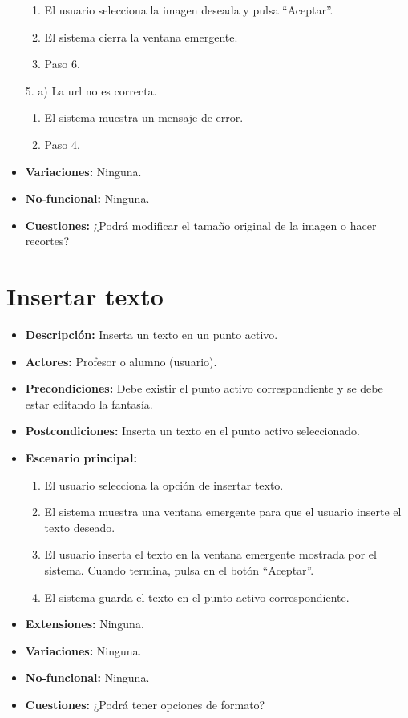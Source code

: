 \documentclass[12pt,letterpaper]{article}
\begin{document}
\begin{itemize}
\begin{enumerate}
		\item El usuario selecciona la imagen deseada y pulsa ``Aceptar''.
		\item El sistema cierra la ventana emergente.
		\item Paso 6.
	\end{enumerate}
	5. a) La url no es correcta.
	\begin{enumerate}
		\item El sistema muestra un mensaje de error.
		\item Paso 4.
	\end{enumerate}
	\item \textbf{Variaciones:} Ninguna.
	\item \textbf{No-funcional:} Ninguna.
	\item \textbf{Cuestiones:} ¿Podrá modificar el tamaño original de la imagen o hacer recortes?
\end{itemize}

\section{Insertar texto} %
\begin{itemize}
	\item \textbf{Descripción:} Inserta un texto en un punto activo.
	\item \textbf{Actores:} Profesor o alumno (usuario).
	\item \textbf{Precondiciones:} Debe existir el punto activo correspondiente y se debe estar editando la fantasía.
	\item \textbf{Postcondiciones:} Inserta un texto en el punto activo seleccionado.
	\item \textbf{Escenario principal:}
	\begin{enumerate}
		\item El usuario selecciona la opción de insertar texto.
		\item El sistema muestra una ventana emergente para que el usuario inserte el texto deseado.
		\item El usuario inserta el texto en la ventana emergente mostrada por el sistema. Cuando termina, pulsa en el botón ``Aceptar''.
		\item El sistema guarda el texto en el punto activo correspondiente.
	\end{enumerate}
	\item \textbf{Extensiones:} Ninguna.
	\item \textbf{Variaciones:} Ninguna.
	\item \textbf{No-funcional:} Ninguna.
	\item \textbf{Cuestiones:} ¿Podrá tener opciones de formato?
\end{itemize}
\end{document}
